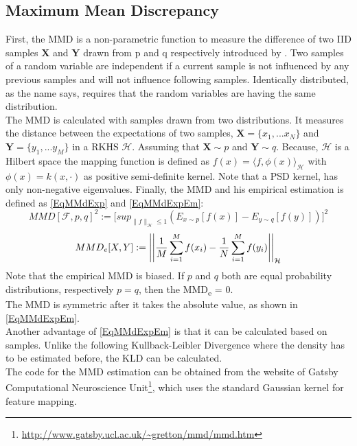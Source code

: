 \subsection{Maximum Mean Discrepancy}\label{TlSubSecMMD}
First, the \acl{MMD} is a non-parametric function to measure the difference of two \ac{IID} samples $\mathbf{X}$ and $\mathbf{Y}$ drawn from p and q respectively introduced by \cite[p. 724-728]{Gretton.2012}.
Two samples of a random variable are independent if a current sample is not influenced by any previous samples and will not influence following samples.
Identically  distributed, as the name says, requires that the random variables are having the same distribution.\cite[p. 7-8]{Czado.2011}\\
The \acs{MMD} is calculated with samples drawn from two distributions.
It measures the distance between the expectations of two samples, $\textbf{X}=\{x_1,...x_N\}$ and $\textbf{Y}=\{y_1,...y_M\}$
in a \ac{RKHS} $\mathcal{H}$.
Assuming that $\mathbf{X} \sim p$ and $\mathbf{Y} \sim q$.
Because, $\mathcal{H}$ is a Hilbert space the mapping function is defined as $f(x) = \langle f,\phi(x) \rangle_\mathcal{H}$ with $\phi(x) = k(x,\cdot)$ as positive semi-definite kernel.
Note that a \ac{PSD} kernel, has only non-negative eigenvalues.\cite[p. 30]{Scholkopf.2001}
Finally, the \acs{MMD} and his empirical estimation is defined as \eqref{EqMMdExp} and \eqref{EqMMdExpEm}:\cite[p. 726-727]{Gretton.2012}
\begin{equation}\label{EqMMdExp}
MMD[\mathcal{F},p,q]^2:=\big[sup_{\|f\|_\mathcal{H} \le 1 }(E_{x\sim p}[f(x)] - E_{y\sim q}[f(y)])\big]^2
\end{equation}
\begin{equation}\label{EqMMdExpEm}
MMD_e[X,Y]:= \left\vert\left\vert\frac{1}{M}\sum_{i=1}^{M}f(x_i) - \frac{1}{N}\sum_{i=1}^{M}f(y_i)\right\vert\right\vert_{\mathcal{H}}
\end{equation}
Note that the empirical \acs{MMD} is biased.
If $p$ and $q$ both are equal probability distributions, respectively $p = q$, then the \ac{MMD}\textsubscript{e} = 0.\cite[p. 726-727]{Gretton.2012}\\
The \acs{MMD} is symmetric after it takes the absolute value, as shown in \eqref{EqMMdExpEm}.\\
Another advantage of \eqref{EqMMdExpEm} is that it can be calculated based on samples.
Unlike the following Kullback-Leibler Divergence where the density has to be estimated before, the \acs{KLD} can be calculated.\cite{Long.2015}\\
The code for the \acs{MMD} estimation can be obtained from the website of Gatsby Computational Neuroscience Unit\footnote{\url{http://www.gatsby.ucl.ac.uk/~gretton/mmd/mmd.htm}}, which uses the standard Gaussian kernel for feature mapping.

